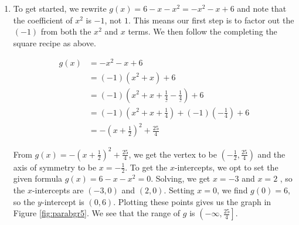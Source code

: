 {\begin{enumerate}
Of course, we can always check our answer by multiplying out $f(x) = (x-2)^2 -1$ to see that it simplifies to $f(x) = x^2 - 4x - 1$. In the form $f(x) = (x-2)^2-1$, we readily find the vertex to be $(2,-1)$ which makes the axis of symmetry $x = 2$.  To find the $x$-intercepts, we set $y = f(x) = 0$.  We are spoiled for choice, since we have \textit{two} formulas for $f(x)$.  Since we recognize $f(x) = x^2-4x+3$ to be easily factorable, (experience pays off, here!) we proceed to solve $x^2-4x+3 = 0$.  Factoring gives $(x-3)(x-1) = 0$ so that $x = 3$ or $x=1$.  The $x$-intercepts are then $(1,0)$ and $(3,0)$.  To find the $y$-intercept, we set $x=0$.  Once again, the general form $f(x) = x^2-4x+3$ is easiest to work with here,  and we find $y = f(0) = 3$.  Hence, the $y$-intercept is $(0,3)$.  With the vertex, axis of symmetry and the intercepts, we get a pretty good graph without the need to plot additional points.  We see that the range of $f$ is $[-1,\infty)$ and we are done. The graph of $f$ is given in Figure \ref{fig:parabgr4}.

\drawexampleline

\item  To get started, we rewrite $g(x) = 6-x-x^2 = -x^2-x+6$ and note that the coefficient of $x^2$ is $-1$, not $1$.  This means our first step is to factor out the $(-1)$ from both the $x^2$ and $x$ terms.  We then follow the completing the square recipe as above. 

\begin{align*}
g(x) & =  -x^2-x+6  \\
	   & = (-1)\left(x^2 + x \right) + 6  \tag*{(Factor the coefficient of $x^2$ from $x^2$ and $x$.)} \\
		 & = (-1)\left(x^2 + x + \underline{\frac{1}{4}} - \underline{\frac{1}{4}} \right) + 6  \\[3pt]
		 & =  (-1)\left(x^2 + x + \frac{1}{4}\right) + (-1)\left(-\frac{1}{4}\right) + 6  \tag*{(Group the perfect square trinomial.)}\\
		  & =  -\left(x +\frac{1}{2}\right)^2 + \frac{25}{4}
\end{align*}


From $g(x) =  -\left(x +\frac{1}{2}\right)^2 + \frac{25}{4}$, we get the vertex to be $\left(-\frac{1}{2}, \frac{25}{4}\right)$ and the axis of symmetry to be $x = -\frac{1}{2}$.  To get the $x$-intercepts, we opt to set the given formula $g(x) = 6-x-x^2 = 0$.  Solving, we get $x = -3$ and $x=2$ , so the $x$-intercepts are $(-3,0)$ and $(2,0)$.  Setting $x=0$, we find $g(0) = 6$, so the $y$-intercept is $(0,6)$. Plotting these points gives us the graph in Figure \ref{fig:parabgr5}.  We see that the range of $g$ is $\left(-\infty, \frac{25}{4}\right]$.
\end{enumerate}
}

